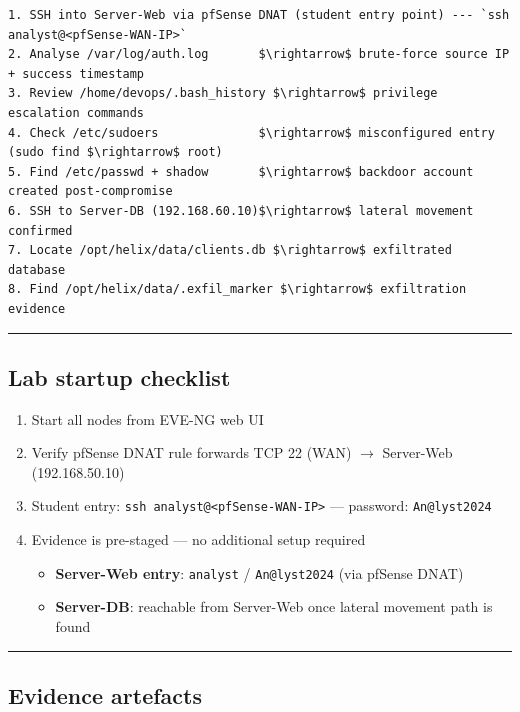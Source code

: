 \begin{lstlisting}
1. SSH into Server-Web via pfSense DNAT (student entry point) --- `ssh analyst@<pfSense-WAN-IP>`
2. Analyse /var/log/auth.log       $\rightarrow$ brute-force source IP + success timestamp
3. Review /home/devops/.bash_history $\rightarrow$ privilege escalation commands
4. Check /etc/sudoers              $\rightarrow$ misconfigured entry (sudo find $\rightarrow$ root)
5. Find /etc/passwd + shadow       $\rightarrow$ backdoor account created post-compromise
6. SSH to Server-DB (192.168.60.10)$\rightarrow$ lateral movement confirmed
7. Locate /opt/helix/data/clients.db $\rightarrow$ exfiltrated database
8. Find /opt/helix/data/.exfil_marker $\rightarrow$ exfiltration evidence
\end{lstlisting}

\begin{center}\rule{0.5\linewidth}{0.5pt}\end{center}

\subsection{Lab startup checklist}

\begin{enumerate}
\def\labelenumi{\arabic{enumi}.}
\item
  Start all nodes from EVE-NG web UI
\item
  Verify pfSense DNAT rule forwards TCP 22 (WAN) $\rightarrow$ Server-Web (192.168.50.10)
\item
  Student entry: \texttt{ssh\ analyst@\textless{}pfSense-WAN-IP\textgreater{}} --- password: \texttt{An@lyst2024}
\item
  Evidence is pre-staged --- no additional setup required

  \begin{itemize}
  \tightlist
  \item
    \textbf{Server-Web entry}: \texttt{analyst} / \texttt{An@lyst2024} (via pfSense DNAT)
  \item
    \textbf{Server-DB}: reachable from Server-Web once lateral movement path is found
  \end{itemize}
\end{enumerate}

\begin{center}\rule{0.5\linewidth}{0.5pt}\end{center}

\subsection{Evidence artefacts}

